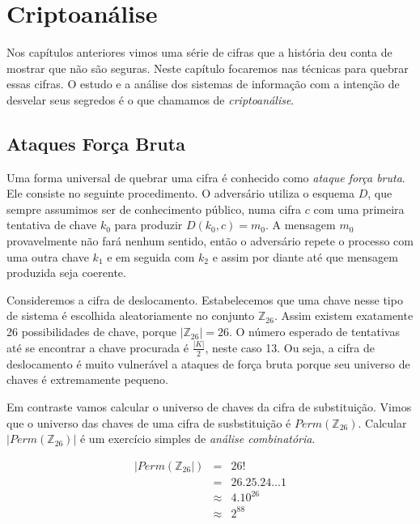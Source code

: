 ﻿\chapter{Criptoanálise}
\label{cha:criptoanalise}

Nos capítulos anteriores vimos uma série de cifras que a história deu conta de mostrar que não são seguras.
Neste capítulo focaremos nas técnicas para quebrar essas cifras.
O estudo e a análise dos sistemas de informação com a intenção de desvelar seus segredos é o que chamamos de {\em criptoanálise}.

\section{Ataques Força Bruta}
\label{sec:forca-bruta}

Uma forma universal de quebrar uma cifra é conhecido como {\em ataque força bruta}.
Ele consiste no seguinte procedimento.
O adversário utiliza o esquema $D$, que sempre assumimos ser de conhecimento público, numa cifra $c$ com uma primeira tentativa de chave $k_0$ para produzir $D(k_0, c) = m_0$.
A mensagem $m_0$ provavelmente não fará nenhum sentido, então o adversário repete o processo com uma outra chave $k_1$ e em seguida com $k_2$ e assim por diante até que mensagem produzida seja coerente.

Consideremos a cifra de deslocamento.
Estabelecemos que uma chave nesse tipo de sistema é escolhida aleatoriamente no conjunto $\mathbb{Z}_{26}$.
Assim existem exatamente 26 possibilidades de chave, porque $|\mathbb{Z}_{26}| = 26$.
O número esperado de tentativas até se encontrar a chave procurada é $\frac{|K|}{2}$, neste caso 13.
Ou seja, a cifra de deslocamento é muito vulnerável a ataques de força bruta porque seu universo de chaves é extremamente pequeno.

Em contraste vamos calcular o universo de chaves da cifra de substituição.
Vimos que o universo das chaves de uma cifra de susbstituição é $Perm(\mathbb{Z}_{26})$.
Calcular $|Perm(\mathbb{Z}_{26})|$ é um exercício simples de {\em análise combinatória}.

\begin{eqnarray*}
  |Perm(\mathbb{Z}_{26}|) & = & 26!\\
                         & = & 26.25.24 \dots 1\\
                         & \approx & 4.10^{26}\\
                         & \approx & 2^{88}
\end{eqnarray*}

